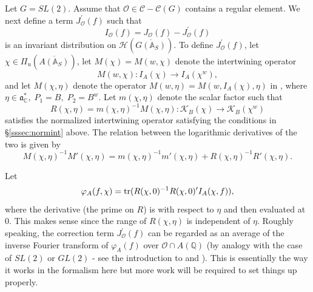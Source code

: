 Let $G=SL(2)$. Assume that
${\mathcal{O}}\in {\mathcal{C}}-{\mathcal{C}}(G)$
contains a regular element.
We next define a term $J_{{\mathcal{O}}}^{\prime }(f)$
such that 
\begin{equation}\label{eq:6.12}
I_{{\mathcal{O}}}(f)=J_{{\mathcal{O}}}(f)-J_{{\mathcal{O}}}^{\prime }(f)
\end{equation}
is an invariant distribution on ${\mathcal{H}}(\overline{G({\mathbb{A}}_S)})$.
To define $J_{\mathcal{O}}^{\prime }(f)$, let
$\chi \in \Pi _u(\overline{A({\mathbb{A}}_S)})$, let
$M(\chi )=M(w,\chi)$ denote the intertwining operator
\[
M(w,\chi):I_A(\chi )\rightarrow I_A(\chi ^w),
\]
and let $M(\chi ,\eta )$ denote the operator
$M(w,\eta )=M(w,I_A(\chi ),\eta)$ in \cite[section 4, p. 113]{A2},
where $\eta \in {\mathfrak {a}}_{{\mathbb {C}}}^{*},\;P_1=B,\;P_2=B^w$.
Let $m(\chi ,\eta )$ denote the scalar factor such that 
\begin{equation}\label{eq:6.13}
R(\chi ,\eta )=m(\chi ,\eta )^{-1}M(\chi ,\eta ):
{\mathcal K}_B(\chi )\rightarrow {\mathcal K}_B(\chi ^w)
\end{equation}
satisfies the normalized intertwining operator satisfying the conditions in
\S\ref{sssec:normint} above. The relation between the logarithmic
derivatives of the two is given by
\begin{equation}\label{eq:6.14}
M(\chi ,\eta )^{-1}M'(\chi ,\eta )=
m(\chi ,\eta )^{-1}m'(\chi ,\eta )+
R(\chi ,\eta )^{-1}R'(\chi ,\eta ).
\end{equation}

Let 
\begin{equation}\label{eq:6.15}
\varphi _A(f,\chi )
={\rm tr}(R(\chi ,0)^{-1}R(\chi ,0)^{\prime }I_A(\chi ,f)),
\end{equation}
where the derivative (the prime on $R$) is with respect to $\eta $ and then
evaluated at $0$. This makes sense since the range of $R(\chi ,\eta )$ is
independent of $\eta $.
Roughly speaking, the correction term $J_{\mathcal{O}}^{\prime }(f)$ can be
regarded as an average of the inverse Fourier transform of $\varphi _A(f)$
over ${\mathcal{O}}\cap A({\mathbb{Q}})$
(by analogy with the case of $SL(2)$ or $GL(2)$
- see the introduction to \cite{A6} and \cite{LL}). This is
essentially the way
it works in the formalism here but more work will be required to set things
up properly.

